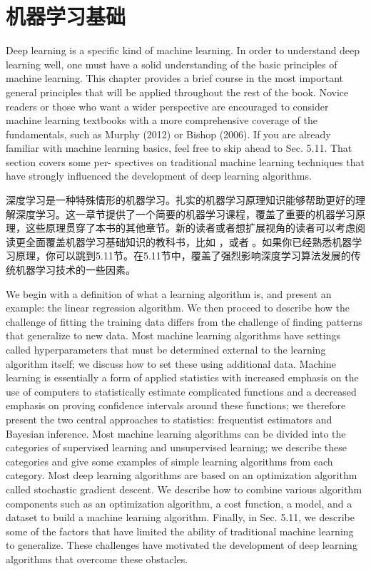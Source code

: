 \chapter{机器学习基础}
\label{ch:ml}

Deep learning is a specific kind of machine learning. In order to understand deep learning well, one must have a solid understanding of the basic principles of machine learning. This chapter provides a brief course in the most important general principles that will be applied throughout the rest of the book. Novice readers or those who want a wider perspective are encouraged to consider machine learning textbooks with a more comprehensive coverage of the fundamentals, such as Murphy (2012) or Bishop (2006). If you are already familiar with machine learning basics, feel free to skip ahead to Sec. 5.11. That section covers some per- spectives on traditional machine learning techniques that have strongly influenced the development of deep learning algorithms.

深度学习是一种特殊情形的机器学习。扎实的机器学习原理知识能够帮助更好的理解深度学习。这一章节提供了一个简要的机器学习课程，覆盖了重要的机器学习原理，这些原理贯穿了本书的其他章节。新的读者或者想扩展视角的读者可以考虑阅读更全面覆盖机器学习基础知识的教科书，比如 \cite{MMmphy}，或者 \cite{Bishop}。如果你已经熟悉机器学习原理，你可以跳到5.11节。在5.11节中，覆盖了强烈影响深度学习算法发展的传统机器学习技术的一些因素。

We begin with a definition of what a learning algorithm is, and present an example: the linear regression algorithm. We then proceed to describe how the challenge of fitting the training data differs from the challenge of finding patterns that generalize to new data. Most machine learning algorithms have settings called hyperparameters that must be determined external to the learning algorithm itself; we discuss how to set these using additional data. Machine learning is essentially a form of applied statistics with increased emphasis on the use of computers to statistically estimate complicated functions and a decreased emphasis on proving confidence intervals around these functions; we therefore present the two central approaches to statistics: frequentist estimators and Bayesian inference. Most machine learning algorithms can be divided into the categories of supervised learning and unsupervised learning; we describe these categories and give some examples of simple learning algorithms from each category. Most deep learning algorithms are based on an optimization algorithm called stochastic gradient descent. We describe how to combine various algorithm components such as an optimization algorithm, a cost function, a model, and a dataset to build a machine learning algorithm. Finally, in Sec. 5.11, we describe some of the factors that have limited the ability of traditional machine learning to generalize. These challenges have motivated the development of deep learning algorithms that overcome these obstacles.

